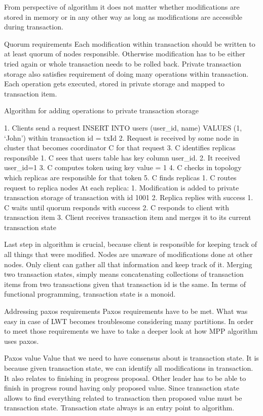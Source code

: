 From perspective of algorithm it does not matter whether modifications are stored in memory or in any other way as long as modifications are accessible during transaction.


Quorum requirements
Each modification within transaction should be written to at least quorum of nodes responsible. Otherwise modification has to be either tried again or whole transaction needs to be rolled back.
Private transaction storage also satisfies requirement of doing many operations within transaction. Each operation gets executed, stored in private storage and mapped to transaction item.


Algorithm for adding operations to private transaction storage


1. Clients send a request INSERT INTO users (user_id, name) VALUES (1, ‘John’) within transaction id = txId
2. Request is received by some node in cluster that becomes coordinator C for that request
3. C identifies replicas responsible
   1. C sees that users table has key column user_id. 
   2. It received user_id=1
   3. C computes token using key value = 1 
   4. C checks in topology which replicas are responsible for that token
   5. C finds replicas
1. C routes request to replica nodes
At each replica:
   1. Modification is added to private transaction storage of transaction with id 1001
   2. Replica replies with success
1. C waits until quorum responds with success
2. C responds to client with transaction item
3. Client receives transaction item and merges it to its current transaction state


Last step in algorithm is crucial, because client is responsible for keeping track of all things that were modified. Nodes are unaware of modifications done at other nodes. Only client can gather all that information and keep track of it.
        Merging two transaction states, simply means concatenating collections of transaction items from two transactions given that transaction id is the same. In terms of functional programming, transaction state is a monoid.




Addressing paxos requirements
Paxos requirements have to be met. What was easy in case of LWT becomes troublesome considering many partitions. In order to meet those requirements we have to take a deeper look at how MPP algorithm uses paxos.


        Paxos value
Value that we need to have consensus about is transaction state. It is because given transaction state, we can identify all modifications in transaction. It also relates to finishing in progress proposal. Other leader has to be able to finish in progress round having only proposed value. Since transaction state allows to find everything related to transaction then proposed value must be transaction state. Transaction state always is an entry point to algorithm.


